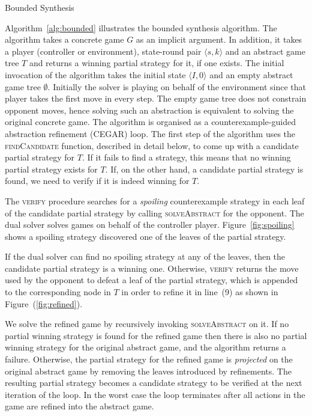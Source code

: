 \documentclass{llncs}
\begin{document}
\begin{algorithm}
    \caption{Bounded Synthesis}
    \label{alg:bounded}
\end{algorithm}
    
Algorithm~\ref{alg:bounded} illustrates the bounded synthesis algorithm. The
algorithm takes a concrete game $G$ as an implicit argument. In addition, it
takes a player (controller or environment), state-round pair $\langle s,
k\rangle$ and an abstract game tree $T$ and returns a winning partial strategy
for it, if one exists.  The initial invocation of the algorithm takes the
initial state $\langle I, 0\rangle$ and an empty abstract game tree
$\emptyset$. Initially the solver is playing on behalf of the environment since
that player takes the first move in every step.  The empty game tree does not
constrain opponent moves, hence solving such an abstraction is equivalent to
solving the original concrete game.  The algorithm is organised as a
counterexample-guided abstraction refinement (CEGAR) loop.  The first step of
the algorithm uses the \textsc{findCandidate} function, described in detail
below, to come up with a candidate partial strategy for $T$. If it fails to
find a strategy, this means that no winning partial strategy exists for $T$.
If, on the other hand, a candidate partial strategy is found, we need to verify
if it is indeed winning for $T$.

The \textsc{verify} procedure searches for a \emph{spoiling} counterexample
strategy in each leaf of the candidate partial strategy by calling
\textsc{solveAbstract} for the opponent. The dual solver solves games on behalf
of the controller player.  {Figure~\ref{fig:spoiling}} shows a spoiling
strategy discovered one of the leaves of the partial strategy.

If the dual solver can find no spoiling strategy at any of the leaves, then the
candidate partial strategy is a winning one. Otherwise, \textsc{verify} returns
the move used by the opponent to defeat a leaf of the partial strategy, which
is appended to the corresponding node in $T$ in order to refine it in line~(9)
as shown in Figure~(\ref{fig:refined}).

We solve the refined game by recursively invoking \textsc{solveAbstract} on it.
If no partial winning strategy is found for the refined game then there is also
no partial winning strategy for the original abstract game, and the algorithm
returns a failure.  Otherwise, the partial strategy for the refined game is
\emph{projected} on the original abstract game by removing the leaves
introduced by refinements. The resulting partial strategy becomes a candidate
strategy to be verified at the next iteration of the loop. In the worst case
the loop terminates after all actions in the game are refined into the abstract
game.
\end{document}
